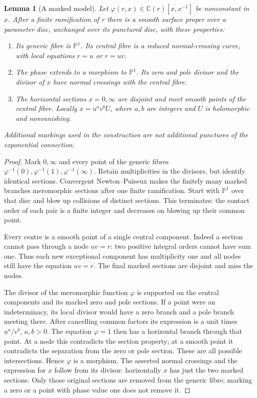 \documentclass[11pt]{article}
\newtheorem{lemma}[theorem]{Lemma}
\theoremstyle{definition}\newtheorem{definition}[theorem]{Definition}
\theoremstyle{remark}\newtheorem{remark}[theorem]{Remark}
\newcommand{\C}{\mathbb C}
\begin{document}
\begin{lemma}[A marked model]\label{lem:markedmodel}
Let $\varphi(r,x)\in\C(r)[x,x^{-1}]$ be nonconstant in $x$.
After a finite ramification of $r$ there is a smooth surface proper
over a parameter disc, unchanged over its punctured disc, with these
properties:
\begin{enumerate}
\item Its generic fibre is $\mathbb P^1$. Its central fibre is a
reduced normal-crossing curve, with local equations $r=u$ or $r=uv$.
\item The phase extends to a morphism to $\mathbb P^1$. Its zero
and pole divisor and the divisor of $x$ have normal crossings with
the central fibre.
\item The horizontal sections $x=0,\infty$ are disjoint and meet
smooth points of the central fibre. Locally $x=u^a v^b U$, where
$a,b$ are integers and $U$ is holomorphic and nonvanishing.
\end{enumerate}
Additional markings used in the construction are not additional
punctures of the exponential connection.
\end{lemma}
\begin{proof}
Mark $0,\infty$ and every point of the generic fibres
$\varphi^{-1}(0),\varphi^{-1}(1),\varphi^{-1}(\infty)$.
Retain multiplicities in the divisors, but identify identical sections.
Convergent Newton--Puiseux makes the finitely many marked branches
meromorphic sections after one finite ramification. Start with
$\mathbb P^1$ over that disc and blow up collisions of distinct
sections. This terminates: the contact order of each pair is a finite
integer and decreases on blowing up their common point.

Every centre is a smooth point of a single central component. Indeed
a section cannot pass through a node $uv=r$: two positive integral
orders cannot have sum one. Thus each new exceptional component has
multiplicity one and all nodes still have the equation $uv=r$.
The final marked sections are disjoint and miss the nodes.

The divisor of the meromorphic function $\varphi$ is supported on
the central components and its marked zero and pole sections. If a
point were an indeterminacy, its local divisor would have a zero
branch and a pole branch meeting there. After cancelling common
factors its expression is a unit times $u^a/v^b$, $a,b>0$.
The equation $\varphi=1$ then has a horizontal branch through that
point. At a node this contradicts the section property; at a smooth
point it contradicts the separation from the zero or pole section.
These are all possible intersections. Hence $\varphi$ is a morphism.
The asserted normal crossings and the expression for $x$ follow
from its divisor: horizontally $x$ has just the two marked sections.
Only those original sections are removed from the generic fibre;
marking a zero or a point with phase value one does not remove it.
\end{proof}
\end{document}
